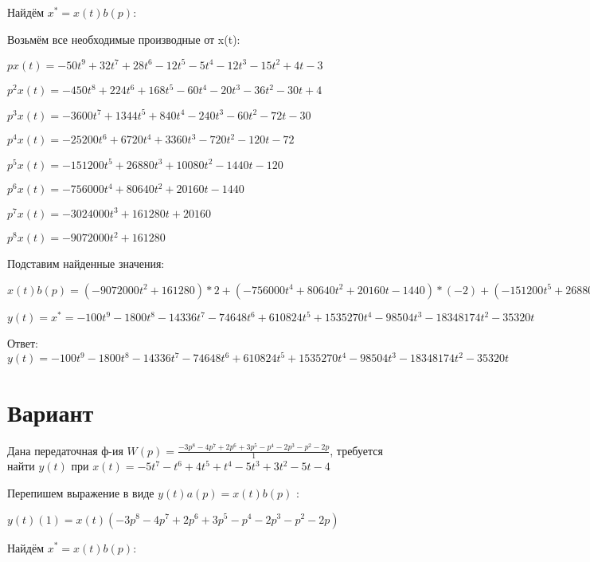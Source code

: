\documentclass{article}
\begin{document}
{{{{Найдём $x^*=x(t)b(p)$:

Возьмём все необходимые производные от x(t):

$px(t)=-50t^{9}+32t^{7}+28t^{6}-12t^{5}-5t^{4}-12t^{3}-15t^{2}+4t-3$

$p^2x(t)=-450t^{8}+224t^{6}+168t^{5}-60t^{4}-20t^{3}-36t^{2}-30t+4$

$p^3x(t)=-3600t^{7}+1344t^{5}+840t^{4}-240t^{3}-60t^{2}-72t-30$

$p^4x(t)=-25200t^{6}+6720t^{4}+3360t^{3}-720t^{2}-120t-72$

$p^5x(t)=-151200t^{5}+26880t^{3}+10080t^{2}-1440t-120$

$p^6x(t)=-756000t^{4}+80640t^{2}+20160t-1440$

$p^7x(t)=-3024000t^{3}+161280t+20160$

$p^8x(t)=-9072000t^{2}+161280$

Подставим найденные значения:

$x(t)b(p) = (-9072000t^{2}+161280)*2+(-756000t^{4}+80640t^{2}+20160t-1440)*(-2)+(-151200t^{5}+26880t^{3}+10080t^{2}-1440t-120)*(-4)+(-25200t^{6}+6720t^{4}+3360t^{3}-720t^{2}-120t-72)*3+(-3600t^{7}+1344t^{5}+840t^{4}-240t^{3}-60t^{2}-72t-30)*4+(-450t^{8}+224t^{6}+168t^{5}-60t^{4}-20t^{3}-36t^{2}-30t+4)*4+(-50t^{9}+32t^{7}+28t^{6}-12t^{5}-5t^{4}-12t^{3}-15t^{2}+4t-3)*(-1)+(-50t^{9}+32t^{7}+28t^{6}-12t^{5}-5t^{4}-12t^{3}-15t^{2}+4t-3)*3=-100t^{9}-1800t^{8}-14336t^{7}-74648t^{6}+610824t^{5}+1535270t^{4}-98504t^{3}-18348174t^{2}-35320t$





$y(t)=x^*=-100t^{9}-1800t^{8}-14336t^{7}-74648t^{6}+610824t^{5}+1535270t^{4}-98504t^{3}-18348174t^{2}-35320t$

Ответ: $y(t) = -100t^{9}-1800t^{8}-14336t^{7}-74648t^{6}+610824t^{5}+1535270t^{4}-98504t^{3}-18348174t^{2}-35320t$

\section{Вариант}

Дана передаточная ф-ия $W(p)=\frac{-3p^{8}-4p^{7}+2p^{6}+3p^{5}-p^{4}-2p^{3}-p^{2}-2p}{1}$, требуется найти $y(t)$ при $x(t)=-5t^{7}-t^{6}+4t^{5}+t^{4}-5t^{3}+3t^{2}-5t-4$

Перепишем выражение в виде $y(t)a(p)=x(t)b(p)$ :

$y(t)(1)=x(t)(-3p^{8}-4p^{7}+2p^{6}+3p^{5}-p^{4}-2p^{3}-p^{2}-2p)$

Найдём $x^*=x(t)b(p)$:

}}}}
\end{document}
